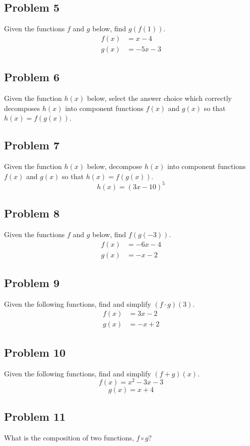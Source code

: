 \documentclass[12pt]{article}
\begin{document}
\subsection*{Problem 5}
Given the functions \( f \) and \( g \) below, find \( g(f(1)) \).
\begin{align*}
    f(x) &= x - 4\\
    g(x) &= -5x - 3
\end{align*}

\subsection*{Problem 6}
Given the function \(h(x)\) below, select the answer choice which correctly decomposes \(h(x)\) into component functions \(f(x)\) and \(g(x)\) so that \(h(x)=f(g(x))\).

\subsection*{Problem 7}
Given the function \( h(x) \) below, decompose \( h(x) \) into component functions \( f(x) \) and \( g(x) \) so that \( h(x) = f(g(x)) \).
\[ h(x) = (3x - 10)^5 \]

\subsection*{Problem 8}
Given the functions \(f\) and \(g\) below, find \(f(g(-3))\).
\begin{align*}
    f(x)&=-6x-4\\
    g(x)&=-x-2
\end{align*}

\subsection*{Problem 9}
Given the following functions, find and simplify \((f \cdot g)(3) \).
\begin{align*}
    f(x)&=3x-2\\
    g(x)&=-x+2
\end{align*}

\subsection*{Problem 10}
Given the following functions, find and simplify \( (f + g)(x) \).
\[ f(x) = x^2 - 3x - 3 \]
\[ g(x) = x + 4 \]

\subsection*{Problem 11}
What is the composition of two functions, \(f \circ g\)?
\end{document}
